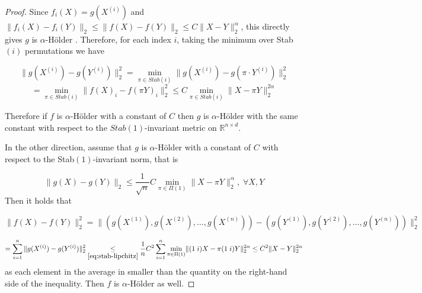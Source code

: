 \documentclass[twoside,11pt]{article}
\newcommand{\RR}{\mathbb{R}}
\newcommand{\ah}{$\alpha$-H\"older }
\begin{document}
\begin{proof}
Since $f_i(X) = g(X^{(i)})$ and $\|f_i(X)-f_i(Y)\|_2 \leq \|f(X)-f(Y)\|_2 \leq C \|X-Y \|^{\alpha}_2$, this directly gives $g$ is \ah. Therefore, for each index $i$, taking the minimum over Stab$(i)$ permutations we have

    
    $$\|g(X^{(i)})- g(Y^{(i)})\|_2^2 = \underset{\pi \in Stab(i)}{\min}  \|g(X^{(i)}) - g(\pi \cdot Y^{(i)}) \|_2^2   $$ $$  = \underset{\pi \in Stab(i)}{\min} \| f(X)_i- f(\pi Y)_i\|_2^2 \leq C \underset{\pi \in Stab(i)}{\min}  \|X - \pi Y \|_2^{2\alpha}$$




    
    Therefore if $f$ is \ah  
 with a constant of $C$ then $g$ is \ah with the same constant with respect to the $Stab(1)$-invariant metric on $\RR^{n\times d}.$

    
In the other direction, assume that $g$ is \ah with a constant of $C$ with respect to the Stab$(1)$-invariant norm, that is

    \begin{equation}\label{eq:stab-lipchitz}
         \|g(X) - g(Y) \|_2 \leq \frac{1}{\sqrt{n}}C \underset{\pi \in \Pi(1)}{\min} \| X - \pi Y\|_2^{\alpha}, \;   \forall X,Y
    \end{equation}
Then it holds that 

    $$ \| f(X) - f(Y) \|_2^2 = \|\left( g(X^{(1)}), g(X^{(2)}), \ldots, g(X^{(n)}) \right)  - \left( g(Y^{(1)}), g(Y^{(2)}), \ldots, g(Y^{(n)}) \right)\|_2^2  $$

    $$ =\sum_{i=1}^{n}\|g(X^{(i)}) - g(Y^{(i)}) \|_2^2 \underset{\cref{eq:stab-lipchitz}}{\leq } \frac{1}{n}C^{2}\sum_{i=1}^{n} \underset{\pi \in \Pi(1)}{\min}\| (1\; i)X - \pi(1\; i)Y \|_2^{2\alpha} \leq C^2 \|X - Y \|_2^{2\alpha}$$
    as each element in the average in smaller than the quantity on the right-hand side of the inequality. Then $f$ is \ah as well.
\end{proof}
\end{document}
